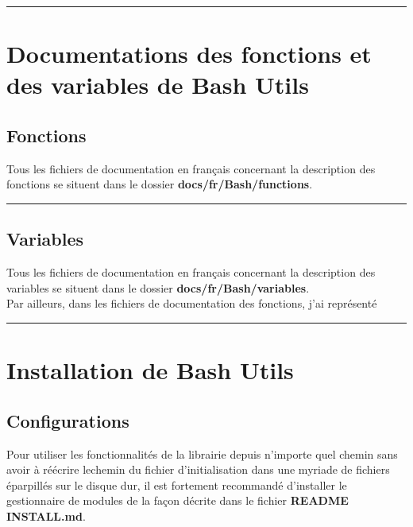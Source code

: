 \documentclass[a4paper,10pt]{article}
\begin{document}
\color{red}\par\noindent\rule{\textwidth}{0.4pt}\color{white}

\color{red}
\section{Documentations des fonctions et des variables de Bash Utils}\color{white}

\color{green}
\subsection{Fonctions}\color{white}
Tous les fichiers de documentation en français concernant la description des fonctions se situent dans le dossier \color{lime}\textbf{docs/fr/Bash/functions}\color{white}.\\[1\baselineskip]



\color{green}\par\noindent\rule{\textwidth}{0.4pt}\color{white}

\color{green}
\subsection{Variables}\color{white}
Tous les fichiers de documentation en français concernant la description des variables se situent dans le dossier \color{lime}\textbf{docs/fr/Bash/variables}\color{white}.\\[1\baselineskip]

Par ailleurs, dans les fichiers de documentation des fonctions, j'ai représenté \\[1\baselineskip]

\color{red}\par\noindent\rule{\textwidth}{0.4pt}\color{white}

\color{red}
\section{Installation de Bash Utils}\color{white}

\color{green}
\subsection{Configurations}\color{white}
Pour utiliser les fonctionnalités de la librairie depuis n'importe quel chemin sans avoir à réécrire le\linebreak chemin du fichier d'initialisation dans une myriade de fichiers éparpillés sur le disque dur, il est fortement recommandé d'installer le gestionnaire de modules de la façon décrite dans le fichier \textbf{\color{lime}README INSTALL.md\color{white}}.\\[1\baselineskip]
\end{document}
